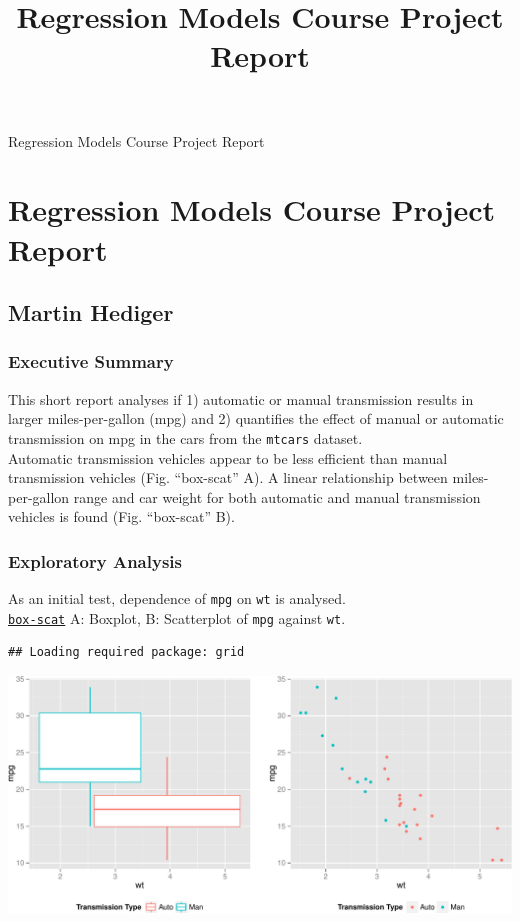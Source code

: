 \documentclass[]{article}
\title{Regression Models Course Project Report}
\author{}
\date{}
\begin{document}
\begin{center}
\huge Regression Models Course Project Report \\[0.2cm]
\end{center}
\normalsize


\section{Regression Models Course Project
Report}\label{regression-models-course-project-report}

\subsection{Martin Hediger}\label{martin-hediger}

\subsubsection{Executive Summary}\label{executive-summary}

This short report analyses if 1) automatic or manual transmission
results in larger miles-per-gallon (mpg) and 2) quantifies the effect of
manual or automatic transmission on mpg in the cars from the
\texttt{mtcars} dataset.\\Automatic transmission vehicles appear to be
less efficient than manual transmission vehicles (Fig. ``box-scat'' A).
A linear relationship between miles-per-gallon range and car weight for
both automatic and manual transmission vehicles is found (Fig.
``box-scat'' B).

\subsubsection{Exploratory Analysis}\label{exploratory-analysis}

As an initial test, dependence of \texttt{mpg} on \texttt{wt} is
analysed.\\\href{https://github.com/mzhKU/regmods_course_project/blob/master/box-scat.R}{\texttt{box-scat}}
A: Boxplot, B: Scatterplot of \texttt{mpg} against \texttt{wt}.

\begin{verbatim}
## Loading required package: grid
\end{verbatim}

\includegraphics{./min_files/figure-latex/unnamed-chunk-1.pdf}
\end{document}
